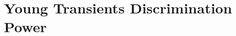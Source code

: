 %
%
%
%
%
%
%
%
%
%
%

\section{Young Transients Discrimination Power}
\def\secname{transientsAge}\label{sec:\secname} %


